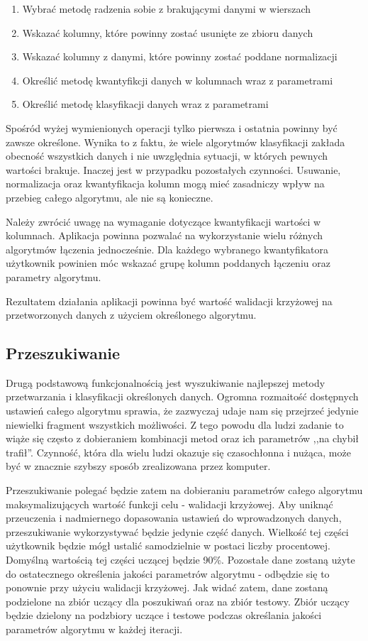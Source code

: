 \documentclass[../thesis.tex]{subfiles}
\begin{document}
\begin{enumerate}
	\item Wybrać metodę radzenia sobie z brakującymi danymi w wierszach
	\item Wskazać kolumny, które powinny zostać usunięte ze zbioru danych
	\item Wskazać kolumny z danymi, które powinny zostać poddane normalizacji
	\item Określić metodę kwantyfikcji danych w kolumnach wraz z parametrami
	\item Określić metodę klasyfikacji danych wraz z parametrami
\end{enumerate}

Spośród wyżej wymienionych operacji tylko pierwsza i ostatnia powinny być zawsze określone. Wynika to z faktu, że wiele algorytmów klasyfikacji zakłada obecność wszystkich danych i nie uwzględnia sytuacji, w których pewnych wartości brakuje. Inaczej jest w przypadku pozostałych czynności. Usuwanie, normalizacja oraz kwantyfikacja kolumn mogą mieć zasadniczy wpływ na przebieg całego algorytmu, ale nie są konieczne.

Należy zwrócić uwagę na wymaganie dotyczące kwantyfikacji wartości w kolumnach. Aplikacja powinna pozwalać na wykorzystanie wielu różnych algorytmów łączenia jednocześnie. Dla każdego wybranego kwantyfikatora użytkownik powinien móc wskazać grupę kolumn poddanych łączeniu oraz parametry algorytmu.

Rezultatem działania aplikacji powinna być wartość walidacji krzyżowej na przetworzonych danych z użyciem określonego algorytmu.

\subsection{Przeszukiwanie}

Drugą podstawową funkcjonalnością jest wyszukiwanie najlepszej metody przetwarzania i klasyfikacji określonych danych. Ogromna rozmaitość dostępnych ustawień całego algorytmu sprawia, że zazwyczaj udaje nam się przejrzeć jedynie niewielki fragment wszystkich możliwości. Z tego powodu dla ludzi zadanie to wiąże się często z dobieraniem kombinacji metod oraz ich parametrów ,,na chybił trafił''. Czynność, która dla wielu ludzi okazuje się czasochłonna i nużąca, może być w znacznie szybszy sposób zrealizowana przez komputer.

Przeszukiwanie polegać będzie zatem na dobieraniu parametrów całego algorytmu maksymalizujących wartość funkcji celu - walidacji krzyżowej. Aby uniknąć przeuczenia i nadmiernego dopasowania ustawień do wprowadzonych danych, przeszukiwanie wykorzystywać będzie jedynie część danych. Wielkość tej części użytkownik będzie mógł ustalić samodzielnie w postaci liczby procentowej. Domyślną wartością tej części uczącej będzie 90\%. Pozostałe dane zostaną użyte do ostatecznego określenia jakości parametrów algorytmu - odbędzie się to ponownie przy użyciu walidacji krzyżowej. Jak widać zatem, dane zostaną podzielone na zbiór uczący dla poszukiwań oraz na zbiór testowy. Zbiór uczący będzie dzielony na podzbiory uczące i testowe podczas określania jakości parametrów algorytmu w każdej iteracji. 
\end{document}
